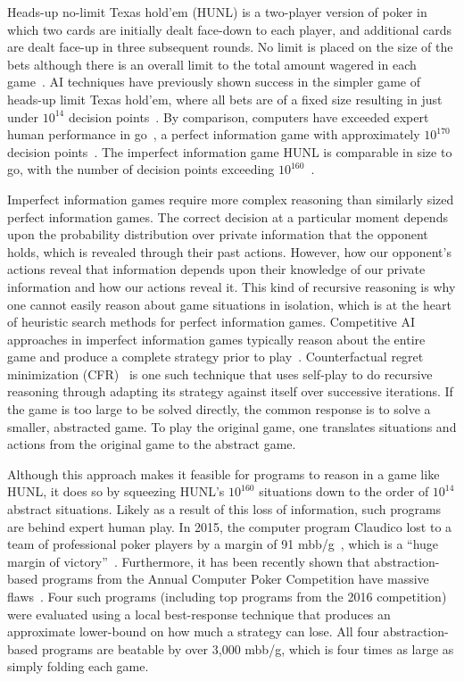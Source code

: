 \documentclass[12pt]{article}
\newcommand{\HUNL}{{HUNL}}
\begin{document}
Heads-up no-limit Texas hold'em (HUNL) is a two-player version of poker in which two cards are initially dealt face-down to each player, and additional cards are dealt face-up in three subsequent rounds. No limit is placed on the size of the bets although there is an overall limit to the total amount wagered in each game~\cite{SOM}. AI techniques have previously shown success in the simpler game of heads-up limit Texas hold'em, where all bets are of a fixed size resulting in just under $10^{14}$ decision points~\cite{progress-in-hulhe}.
By comparison, computers have exceeded expert human performance in go~\cite{Silver16:AlphaGo}, a perfect information game with approximately $10^{170}$ decision points~\cite{allis1994}. The imperfect information game HUNL is comparable in size to go, with the number of decision points exceeding $10^{160}$~\cite{Johanson13:Sizes}.

Imperfect information games require more complex reasoning than similarly sized perfect information games. 
The correct decision at a particular moment depends upon the probability distribution over private information that the opponent holds, which is revealed through their past actions.
However, how our opponent's actions reveal that information depends upon their knowledge of our private information and how our actions reveal it.
This kind of recursive reasoning is why one cannot easily reason about game situations in isolation, which is at the heart of heuristic search methods for perfect information games.  
Competitive AI approaches in imperfect information games typically reason about the entire game and produce a complete strategy prior to play~\cite{ZinkevichEtAl07,GilpinEtAl07,endgame-solving-exception}.
Counterfactual regret minimization (CFR)~\cite{ZinkevichEtAl07,cprg:cfrd,Bowling15:Cepheus} is one such technique that uses self-play to do recursive reasoning through adapting its strategy against itself over successive iterations.  If the game is too large to be solved directly, the common response is to solve a smaller, abstracted game.  To play the original game, one translates situations and actions from the original game to the abstract game.

Although this approach makes it feasible for programs to reason in a game like \HUNL, it does so by squeezing \HUNL's $10^{160}$ situations down to the order of $10^{14}$ abstract situations.  Likely as a result of this loss of information, such programs are behind expert human play.  In 2015, the computer program Claudico lost to a team of professional poker players by a margin of 91 mbb/g~\cite{milli-big-blinds},
which is a ``huge margin of victory''~\cite{Wood15:PokerFuse-Claudico}.  Furthermore, it has been recently shown that abstraction-based programs from the Annual Computer Poker Competition have massive flaws~\cite{Lisy17:LocalBR}. Four such programs (including top programs from the 2016 competition) were evaluated using a local best-response technique that produces an approximate lower-bound on how much a strategy can lose.  All four abstraction-based programs are beatable by over 3,000 mbb/g, which is four times as large as simply folding each game.
\end{document}

